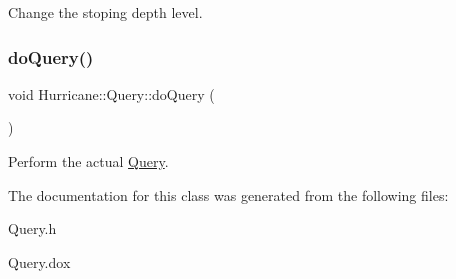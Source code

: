 Change the stoping depth level. \mbox{\label{classHurricane_1_1Query_a2ca5bf71c7b35e14c4a64488a5e21bc6}} 
\subsubsection{\texorpdfstring{do\+Query()}{doQuery()}}
{\footnotesize\ttfamily void Hurricane\+::\+Query\+::do\+Query (\begin{DoxyParamCaption}{ }\end{DoxyParamCaption})\hspace{0.3cm}{\ttfamily [virtual]}}

Perform the actual \hyperlink{classHurricane_1_1Query}{Query}. 

The documentation for this class was generated from the following files\+:\begin{DoxyCompactItemize}
\item 
Query.\+h\item 
Query.\+dox\end{DoxyCompactItemize}
